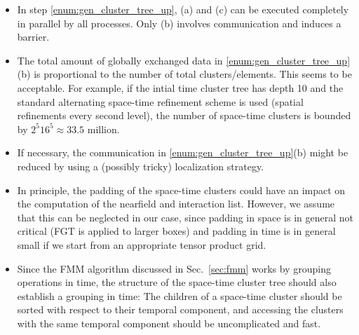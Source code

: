 \documentclass[a4paper,11pt]{article}
\theoremstyle{plain}
\theoremstyle{definition}
\theoremstyle{remark}
\begin{document}
\begin{itemize}
  \item In step \ref{enum:gen_cluster_tree_up}, (a) and (c) can be executed completely in parallel by all processes. Only (b) involves communication and induces a barrier.
  \item The total amount of globally exchanged data in \ref{enum:gen_cluster_tree_up}(b) is proportional to the number of total clusters/elements. This seems to be acceptable. For example, if the intial time cluster tree has depth 10 and the standard alternating space-time refinement scheme is used (spatial refinements every second level), the number of space-time clusters is bounded by $2^5 16^5 \approx 33.5$ million. 
  \item If necessary, the communication in \ref{enum:gen_cluster_tree_up}(b) might be reduced by using a (possibly tricky) localization strategy.
  \item In principle, the padding of the space-time clusters could have an impact on the computation of the nearfield and interaction list. However, we assume that this can be neglected in our case, since padding in space is in general not critical (FGT is applied to larger boxes) and padding in time is in general small if we start from an appropriate tensor product grid.
  \item Since the FMM algorithm discussed in Sec.~\ref{sec:fmm} works by grouping operations in time, the structure of the space-time cluster tree should also establish a grouping in time: The children of a space-time cluster should be sorted with respect to their temporal component, and accessing the clusters with the same temporal component should be uncomplicated and fast.
\end{itemize}
\end{document}
